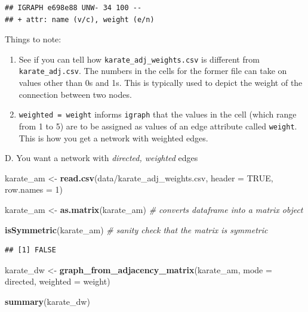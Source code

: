 \documentclass[
]{book}
\newenvironment{Shaded}{\begin{snugshade}}{\end{snugshade}}
\newcommand{\AttributeTok}[1]{\textcolor[rgb]{0.13,0.29,0.53}{#1}}
\newcommand{\CommentTok}[1]{\textcolor[rgb]{0.56,0.35,0.01}{\textit{#1}}}
\newcommand{\ConstantTok}[1]{\textcolor[rgb]{0.56,0.35,0.01}{#1}}
\newcommand{\DecValTok}[1]{\textcolor[rgb]{0.00,0.00,0.81}{#1}}
\newcommand{\FunctionTok}[1]{\textcolor[rgb]{0.13,0.29,0.53}{\textbf{#1}}}
\newcommand{\NormalTok}[1]{#1}
\newcommand{\OtherTok}[1]{\textcolor[rgb]{0.56,0.35,0.01}{#1}}
\newcommand{\StringTok}[1]{\textcolor[rgb]{0.31,0.60,0.02}{#1}}
\providecommand{\tightlist}{%
  \setlength{\itemsep}{0pt}\setlength{\parskip}{0pt}}
\begin{document}
\begin{verbatim}
## IGRAPH e698e88 UNW- 34 100 -- 
## + attr: name (v/c), weight (e/n)
\end{verbatim}

Things to note:

\begin{enumerate}
\def\labelenumi{\arabic{enumi}.}
\tightlist
\item
  See if you can tell how \texttt{karate\_adj\_weights.csv} is different from \texttt{karate\_adj.csv}. The numbers in the cells for the former file can take on values other than 0s and 1s. This is typically used to depict the weight of the connection between two nodes.
\item
  \texttt{weighted\ =\ \textquotesingle{}weight\textquotesingle{}} informs \texttt{igraph} that the values in the cell (which range from 1 to 5) are to be assigned as values of an edge attribute called \texttt{\textquotesingle{}weight\textquotesingle{}}. This is how you get a network with weighted edges.
\end{enumerate}

D. You want a network with \emph{directed, weighted} edges

\begin{Shaded}
\begin{Highlighting}[]
\NormalTok{karate\_am }\OtherTok{\textless{}{-}} \FunctionTok{read.csv}\NormalTok{(}\StringTok{\textquotesingle{}data/karate\_adj\_weights.csv\textquotesingle{}}\NormalTok{, }\AttributeTok{header =} \ConstantTok{TRUE}\NormalTok{, }\AttributeTok{row.names =} \DecValTok{1}\NormalTok{)}

\NormalTok{karate\_am }\OtherTok{\textless{}{-}} \FunctionTok{as.matrix}\NormalTok{(karate\_am) }\CommentTok{\# converts dataframe into a matrix object}

\FunctionTok{isSymmetric}\NormalTok{(karate\_am) }\CommentTok{\# sanity check that the matrix is symmetric }
\end{Highlighting}
\end{Shaded}

\begin{verbatim}
## [1] FALSE
\end{verbatim}

\begin{Shaded}
\begin{Highlighting}[]
\NormalTok{karate\_dw }\OtherTok{\textless{}{-}} \FunctionTok{graph\_from\_adjacency\_matrix}\NormalTok{(karate\_am, }\AttributeTok{mode =} \StringTok{\textquotesingle{}directed\textquotesingle{}}\NormalTok{, }\AttributeTok{weighted =} \StringTok{\textquotesingle{}weight\textquotesingle{}}\NormalTok{)}

\FunctionTok{summary}\NormalTok{(karate\_dw)}
\end{Highlighting}
\end{Shaded}
\end{document}
